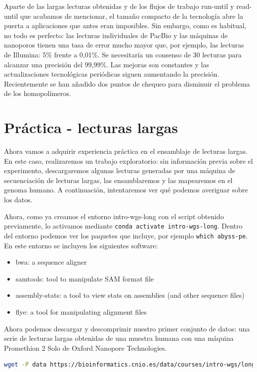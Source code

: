 \begin{itemize}
Aparte de las largas lecturas obtenidas y de los flujos de trabajo run-until y read-until que acabamos de mencionar, el tamaño compacto de la tecnología abre la puerta a aplicaciones que antes eran imposibles.
Sin embargo, como es habitual, no todo es perfecto: las lecturas individuales de PacBio y las máquinas de nanoporos tienen una tasa de error mucho mayor que, por ejemplo, las lecturas de Illumina: 5\% frente a 0,01\%. Se necesitaría un consenso de 30 lecturas para alcanzar una precisión del 99,99\%.
Las mejoras son constantes y las actualizaciones tecnológicas periódicas siguen aumentando la precisión. Recientemente se han añadido dos puntos de chequeo para disminuir el problema de los homopolímeros.

\section{Práctica - lecturas largas}
Ahora vamos a adquirir experiencia práctica en el ensamblaje de lecturas largas.
En este caso, realizaremos un trabajo exploratorio: sin información previa sobre el experimento, descargaremos algunas lecturas generadas por una máquina de secuenciación de lecturas largas, las ensamblaremos y las mapearemos en el genoma humano. A continuación, intentaremos ver qué podemos averiguar sobre los datos.

Ahora, como ya creamos el entorno intro-wgs-long con el script obtenido previamente, lo activamos mediante \texttt{conda activate intro-wgs-long}. Dentro del entorno podemos ver los paquetes que incluye, por ejemplo \texttt{which abyss-pe}. En este entorno se incluyen los siguientes software:
\begin{itemize}
\item bwa: a sequence aligner
\item samtools: tool to manipulate SAM format file
\item assembly-stats: a tool to view stats on assemblies (and other sequence files)
\item flye: a tool for manipulating alignment files
\end{itemize}

Ahora podemos descargar y descomprimir nuestro primer conjunto de datos: una serie de lecturas largas obtenidas de una muestra humana con una máquina Promethion 2 Solo de Oxford Nanopore Technologies.
\begin{lstlisting}[language=bash]
wget -P data https://bioinformatics.cnio.es/data/courses/intro-wgs/long_reads.fastq.gz
\end{lstlisting}


\end{itemize}
